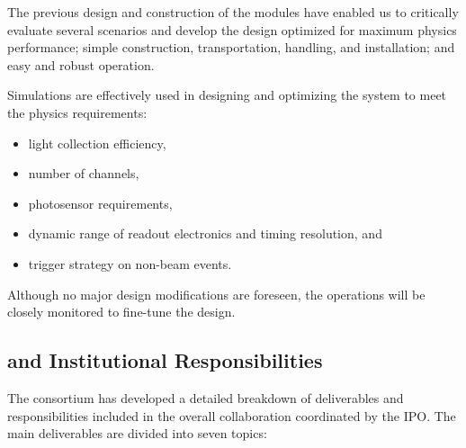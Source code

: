 The previous design and construction of the \dual modules have enabled us to critically evaluate several scenarios and develop the \dune {} design optimized for maximum physics performance; simple construction, transportation, handling, and installation; and easy and robust operation.

Simulations are effectively used in designing and optimizing the \dual {} system to meet the physics requirements:
\begin{itemize}
\item light collection efficiency,
\item number of channels,
\item photosensor requirements,
\item dynamic range of readout electronics and timing resolution, and 
\item trigger strategy on non-beam events.
\end{itemize}

Although no major design modifications are foreseen, the  operations will be closely monitored to fine-tune the \dune \dual design.

\subsection{ and Institutional Responsibilities}

The \dual {} consortium has developed a detailed breakdown of deliverables and responsibilities  included in the overall  collaboration  %
coordinated by the IPO. The main deliverables are %
divided into seven topics: 

